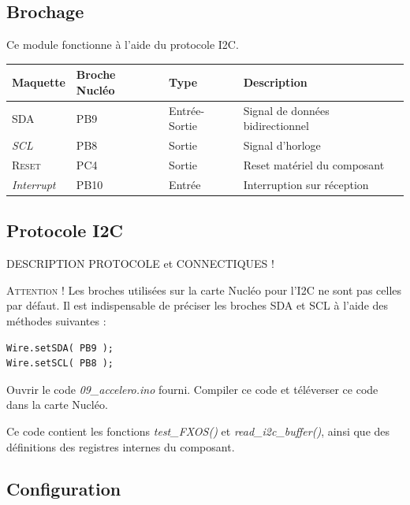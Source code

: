 \documentclass[a4paper,11pt,titlepage]{article} %
\begin{document}
\subsection{Brochage}

Ce module fonctionne à l'aide du protocole I2C.

\begin{center}
\begin{tabular}{|l|l|l|l|}
\hline 
Maquette & \textbf{Broche Nucléo} & Type & Description \\ 
\hline 
\textsc{SDA} & PB9 & Entrée-Sortie & Signal de données bidirectionnel \\ 
\textit{SCL} & PB8 & Sortie & Signal d'horloge\\
\hline 
\textsc{Reset} & PC4 & Sortie & Reset matériel du composant\\ 
\textit{Interrupt} & PB10 & Entrée & Interruption sur réception\\ 
\hline 
\end{tabular} 
\end{center}


\subsection{Protocole I2C}

DESCRIPTION PROTOCOLE et CONNECTIQUES !

\bigskip

\textsc{Attention !} Les broches utilisées sur la carte Nucléo pour l'I2C ne sont pas celles par défaut. Il est indispensable de préciser les broches SDA et SCL à l'aide des méthodes suivantes :

\begin{lstlisting}
Wire.setSDA( PB9 );    
Wire.setSCL( PB8 ); 
\end{lstlisting}

\bigskip

\Manip Ouvrir le code \textsl{09\_accelero.ino} fourni. Compiler ce code et téléverser ce code dans la carte Nucléo.

Ce code contient les fonctions \textsl{test\_FXOS()} et \textsl{read\_i2c\_buffer()}, ainsi que des définitions des registres internes du composant.

\Manip 

\subsection{Configuration}
\end{document}
